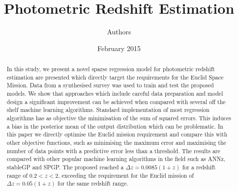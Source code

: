 \documentclass[a4paper,12pt]{article}
\title{Photometric Redshift Estimation}
\author{Authors}
\date{February 2015}
\begin{document}
\maketitle

\begin{abstract}
In this study, we present a novel sparse regression model for photometric redshift estimation are presented which directly target the requirements for the Euclid Space Mission. Data from a synthesised survey was used to train and test the proposed models. We show that approaches which include careful data preparation and model design a significant improvement can be achieved when compared with several off the shelf machine learning algorithms. Standard implementation of most regression algorithms has as objective the minimisation of the sum of squared errors. This induces a bias in the posterior mean of the output distribution which can be problematic. In this paper we directly optimise the Euclid mission requirement and compare this with other objective functions, such as minimising the maximum error and maximising the number of data points with a predictive error less than a threshold. The results are compared with other popular machine learning algorithms in the field such as ANNz, stableGP and SPGP. The proposed reached a $\Delta z = 0.0085(1+z)$ for a redshift range of $0.2 < z < 2$, exceeding the requirement for the Euclid mission of $\Delta z = 0.05(1+z)$ for the same redshift range.

\end{abstract}
\end{document}
